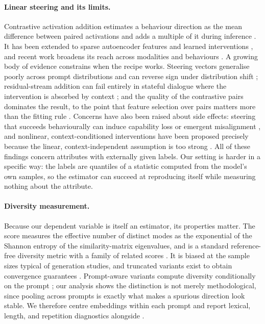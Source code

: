 \paragraph{Linear steering and its limits.}
Contrastive activation addition estimates a behaviour direction as the mean difference between
paired activations and adds a multiple of it during inference
\citep{turner2023steering,rimsky2024steering}. It has been extended to sparse autoencoder
features and learned interventions \citep{zhao2025steering,postmus2024steering}, and recent work
broadens its reach across modalities and behaviours \citep{zhu2026token,park2026information}. A
growing body of evidence constrains when the recipe works. Steering vectors generalise poorly across prompt distributions and can reverse sign
under distribution shift \citep{tan2024analyzing}; residual-stream addition can fail entirely in
stateful dialogue where the intervention is absorbed by context \citep{kang2026promptactivation};
and the quality of the contrastive pairs dominates the result, to the point that feature selection
over pairs matters more than the fitting rule \citep{bohek2026detecting,hao2025patterns}. Concerns
have also been raised about side effects: steering that succeeds behaviourally can induce
capability loss \citep{raj2026steer} or emergent misalignment \citep{cao2026activation}, and
nonlinear, context-conditioned interventions have been proposed precisely because the linear,
context-independent assumption is too strong \citep{jafari2026metasteer}. All of these findings
concern attributes with externally given labels. Our setting is harder in a specific way: the
labels are quantiles of a statistic computed from the model's own samples, so the estimator can
succeed at reproducing itself while measuring nothing about the attribute.

\paragraph{Diversity measurement.}
Because our dependent variable is itself an estimator, its properties matter. The \vendi{} score
measures the effective number of distinct modes as the exponential of the Shannon entropy of the
similarity-matrix eigenvalues, and is a standard reference-free diversity metric
\citep{friedman2022vendi} with a family of related scores \citep{pasarkar2023cousins}. It is biased
at the sample sizes typical of generation studies, and truncated variants exist to obtain
convergence guarantees \citep{ospanov2024vendi}. Prompt-aware variants compute diversity conditionally on the
prompt \citep{jalali2024conditional}; our analysis shows the distinction is not merely
methodological, since pooling across prompts is exactly what makes a spurious direction look stable.
We therefore centre embeddings within each prompt and report lexical, length, and repetition
diagnostics alongside \vendi{}.
